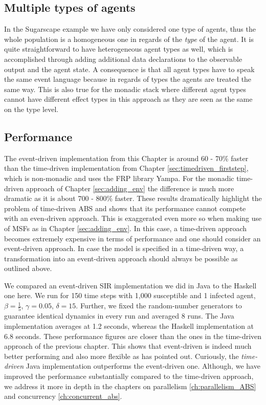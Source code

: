\subsection{Multiple types of agents}
In the Sugarscape example we have only considered one type of agents, thus the whole population is a homogeneous one in regards of the \textit{type} of the agent. It is quite straightforward to have heterogeneous agent types as well, which is accomplished through adding additional data declarations to the observable output and the agent state. A consequence is that all agent types have to speak the same event language because in regards of types the agents are treated the same way. This is also true for the monadic stack where different agent types cannot have different effect types in this approach as they are seen as the same on the type level.

\subsection{Performance}
The event-driven implementation from this Chapter is around 60 - 70\% faster than the time-driven implementation from Chapter \ref{sec:timedriven_firststep}, which is non-monadic and uses the FRP library Yampa. For the monadic time-driven approach of Chapter \ref{sec:adding_env} the difference is much more dramatic as it is about 700 - 800\% faster. These results dramatically highlight the problem of time-driven ABS and shows that its performance cannot compete with an even-driven approach. This is exaggerated even more so when making use of MSFs as in Chapter \ref{sec:adding_env}. In this case, a time-driven approach becomes extremely expensive in terms of performance and one should consider an event-driven approach. In case the model is specified in a time-driven way, a transformation into an event-driven approach should always be possible as outlined above.

We compared an event-driven SIR implementation we did in Java to the Haskell one here. We run for 150 time steps with 1,000 susceptible and 1 infected agent, $\beta = \frac{1}{5}$, $\gamma = 0.05$, $\delta = 15$. Further, we fixed the random-number generators to guarantee identical dynamics in every run and averaged 8 runs. The Java implementation averages at 1.2 seconds, whereas the Haskell implementation at 6.8 seconds. These performance figures are closer than the ones in the time-driven approach of the previous chapter. This shows that event-driven is indeed much better performing and also more flexible as \cite{meyer_event-driven_2014} has pointed out. Curiously, the \textit{time-driven} Java implementation outperforms the event-driven one. Although, we have improved the performance substantially compared to the time-driven approach, we address it more in depth in the chapters on parallelism \ref{ch:parallelism_ABS} and concurrency \ref{ch:concurrent_abs}.

